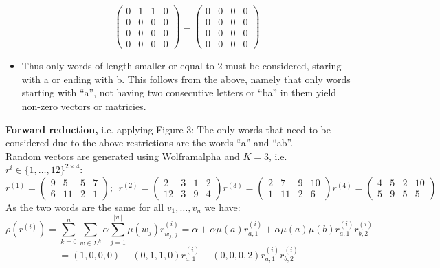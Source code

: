 \begin{itemize}
\[\begin{pmatrix}
                                        0 & 1 & 1 & 0 \\
                                        0 & 0 & 0 & 0 \\
                                        0 & 0 & 0 & 0 \\
                                        0 & 0 & 0 & 0
                                    \end{pmatrix} =  \begin{pmatrix}
                                        0 & 0 & 0 & 0 \\
                                        0 & 0 & 0 & 0 \\
                                        0 & 0 & 0 & 0 \\
                                        0 & 0 & 0 & 0
                                    \end{pmatrix} \]
                \item Thus only words of length smaller or equal to 2 must be considered, staring with a or ending with b. This follows from the above, namely that only words starting with ``a'', not having two consecutive letters or ``ba'' in them yield non-zero vectors or matricies.
            \end{itemize}
            \vspace{1.5cm}

        \textbf{Forward reduction,} i.e. applying \autocite{Kiefer2013OnTC} Figure 3: The only words that need to be considered due to the above restrictions are the words ``a'' and ``ab''.\\
        Random vectors are generated using Wolframalpha and $K=3$, i.e. $r^{i} \in \{1, \dots, 12\}^{2 \times 4}$:
        \[  r^{(1)}= \begin{pmatrix}
                        9 & 5 & 5 & 7 \\
                        6 & 11 & 2 & 1 
                    \end{pmatrix}; \ \
            r^{(2)}= \begin{pmatrix}
                        2 & 3 & 1 & 2 \\
                        12 & 3 & 9 & 4 
                    \end{pmatrix} 
            r^{(3)}= \begin{pmatrix}
                        2 & 7 & 9 & 10 \\
                        1 & 11 & 2 & 6 
                    \end{pmatrix}         
            r^{(4)}= \begin{pmatrix}
                        4 & 5 & 2 & 10 \\
                        5 & 9 & 5 & 5 
                    \end{pmatrix}                     
        \]
        As the two words are the same for all $v_1, \dots, v_n$ we have:
        \[ \rho(r^{(i)}) = \sum_{k=0}^{n} \sum_{w \in \Sigma^k} \alpha \sum_{j=1}^{|w|} \mu(w_j) r^{(i)}_{w_j, j} = \alpha + \alpha\mu(a) r^{(i)}_{a, 1} + \alpha \mu(a) \mu(b) r^{(i)}_{a, 1} r^{(i)}_{b, 2} \]
        \[= (1,0,0,0) + (0,1,1,0) r^{(i)}_{a, 1} + (0,0,0,2) r^{(i)}_{a, 1} r^{(i)}_{b, 2} \]
        

